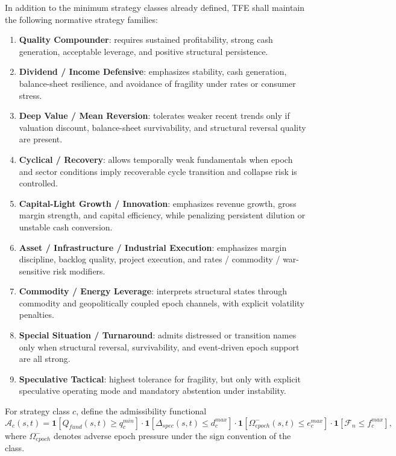 In addition to the minimum strategy classes already defined, TFE shall maintain the following normative strategy families:
\begin{enumerate}[leftmargin=1.2cm]
    \item \textbf{Quality Compounder}: requires sustained profitability, strong cash generation, acceptable leverage, and positive structural persistence.
    \item \textbf{Dividend / Income Defensive}: emphasizes stability, cash generation, balance-sheet resilience, and avoidance of fragility under rates or consumer stress.
    \item \textbf{Deep Value / Mean Reversion}: tolerates weaker recent trends only if valuation discount, balance-sheet survivability, and structural reversal quality are present.
    \item \textbf{Cyclical / Recovery}: allows temporally weak fundamentals when epoch and sector conditions imply recoverable cycle transition and collapse risk is controlled.
    \item \textbf{Capital-Light Growth / Innovation}: emphasizes revenue growth, gross margin strength, and capital efficiency, while penalizing persistent dilution or unstable cash conversion.
    \item \textbf{Asset / Infrastructure / Industrial Execution}: emphasizes margin discipline, backlog quality, project execution, and rates / commodity / war-sensitive risk modifiers.
    \item \textbf{Commodity / Energy Leverage}: interprets structural states through commodity and geopolitically coupled epoch channels, with explicit volatility penalties.
    \item \textbf{Special Situation / Turnaround}: admits distressed or transition names only when structural reversal, survivability, and event-driven epoch support are all strong.
    \item \textbf{Speculative Tactical}: highest tolerance for fragility, but only with explicit speculative operating mode and mandatory abstention under instability.
\end{enumerate}

For strategy class $c$, define the admissibility functional
\[
\mathcal{A}_c(s,t)=\mathbf{1}[Q_{fund}(s,t)\ge q_c^{min}]\cdot \mathbf{1}[\Delta_{spec}(s,t)\le d_c^{max}]\cdot \mathbf{1}[\Omega_{epoch}^{-}(s,t)\le e_c^{max}]\cdot \mathbf{1}[\mathcal{F}_n\le f_c^{max}],
\]
where $\Omega_{epoch}^{-}$ denotes adverse epoch pressure under the sign convention of the class.

